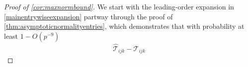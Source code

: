 \documentclass[10pt]{article}
\newcommand{\0}{{\mathbf{0}}}
\newcommand{\1}{{\mathbf{1}}}
\newcommand{\U}{{\mathbf{U}}}
\renewcommand{\t}{^{\top}}
\newcommand{\uhat}{\mathbf{\hat{U}}}
\newcommand{\inv}{^{-1}}
\renewcommand{\hat}{\widehat}
\renewcommand{\hat}{\widehat}
\begin{document}
\begin{proof}[Proof of \cref{cor:maxnormbound}]
We start with the leading-order expansion in \eqref{mainentrywiseexpansion} partway through the proof of \cref{thm:asymptoticnormalityentries}, which demonstrates that with probability at least $1 - O(p^{-9})$
\begin{align}
     \mathcal{\hat T}_{ijk} - \mathcal{T}_{ijk} %

\end{align}
\end{proof}
\end{document}
